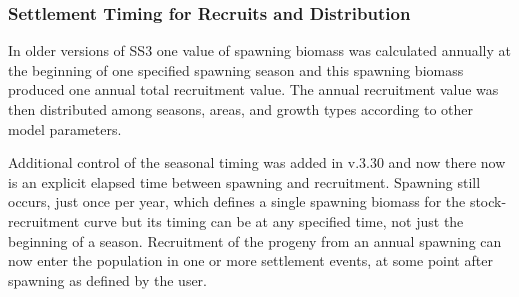 \subsubsection{Settlement Timing for Recruits and Distribution}
In older versions of SS3 one value of spawning biomass was calculated annually at the beginning of one specified spawning season and this spawning biomass produced one annual total recruitment value. The annual recruitment value was then distributed among seasons, areas, and growth types according to other model parameters.

Additional control of the seasonal timing was added in v.3.30 and now there now is an explicit elapsed time between spawning and recruitment. Spawning still occurs, just once per year, which defines a single spawning biomass for the stock-recruitment curve but its timing can be at any specified time, not just the beginning of a season.  Recruitment of the progeny from an annual spawning can now enter the population in one or more settlement events, at some point after spawning as defined by the user.  

